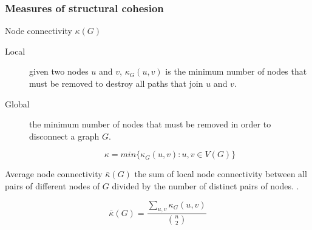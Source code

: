 \documentclass[ignorenonframetext,red,8pt,notes=hide]{beamer}
\begin{document}
\begin{frame}
\frametitle{Measures of structural cohesion}

\begin{block}{Node connectivity $\kappa(G)$}
\begin{description}
\item[Local] given two nodes $u$ and $v$, $\kappa_{G}(u,v)$ is the minimum number of nodes that must be removed to destroy all paths that join $u$ and $v$.

\item[Global] the minimum number of nodes that must be removed in order to disconnect a graph $G$.

\begin{equation*}
\kappa = min{\{\kappa_{G}(u,v):u,v \in V(G)\}}
\end{equation*}

\end{description}

\end{block}

\begin{block}{Average node connectivity $\bar{\kappa}(G)$}
the sum of local node connectivity between all pairs of different nodes of $G$ divided by the number of distinct pairs of nodes. \citep*{beineke:2002}.

\begin{equation*}
\bar{\kappa}(G) = \frac{\sum_{u,v} \kappa_{G}(u,v)}{{n \choose 2}}
\end{equation*}
\end{block}

\end{frame}
\end{document}
